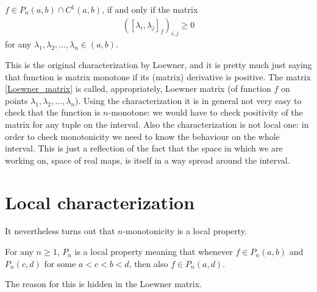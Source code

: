 \begin{lause}
	$f \in P_{n}(a, b) \cap C^{1}(a, b)$, if and only if the matrix
	\begin{align}\label{Loewner_matrix}
		\left([\lambda_{i}, \lambda_{j}]_{f}\right)_{i, j} \geq 0
	\end{align}
	for any $\lambda_{1}, \lambda_{2}, \ldots, \lambda_{n} \in (a, b)$.
\end{lause}

This is the original characterization by Loewner, and it is pretty much just saying that function is matrix monotone if its (matrix) derivative is positive. The matrix \ref{Loewner_matrix} is called, appropriately, Loewner matrix (of function $f$ on points $\lambda_{1}, \lambda_{2}, \ldots, \lambda_{n}$). Using the characterization it is in general not very easy to check that the function is $n$-monotone: we would have to check positivity of the matrix for any tuple on the interval. Also the characterization is not local one: in order to check monotonicity we need to know the behaviour on the whole interval. This is just a reflection of the fact that the space in which we are working on, space of real maps, is itself in a way spread around the interval.

\section{Local characterization}

It nevertheless turns out that $n$-monotonicity is a local property.

\begin{prop}
	For any $n \geq 1$, $P_{n}$ is a local property meaning that whenever $f \in P_{n}(a, b)$ and $P_{n}(c, d)$ for some $a < c < b < d$, then also $f \in P_{n}(a, d)$.
\end{prop}

The reason for this is hidden in the Loewner matrix.

